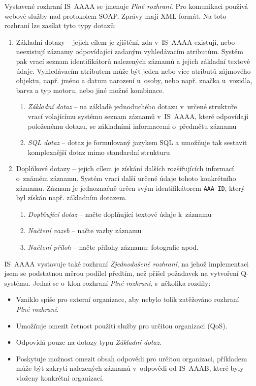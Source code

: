 \documentclass[thesis=M,czech]{FITthesis}[2019/12/23]
\begin{document}
\newpage
Vystavené rozhraní IS~AAAA se jmenuje \textit{Plné rozhraní}. Pro komunikaci používá webové služby nad protokolem SOAP. Zprávy mají XML formát.
Na toto rozhraní lze zasílat tyto typy dotazů: \cite{i1}
\begin{enumerate}
	\item Základní dotazy -- jejich cílem je zjištění, zda v~IS~AAAA existují, nebo neexistují záznamy odpovídající zadaným vyhledávacím atributům. Systém pak vrací seznam identifikátorů nalezených záznamů a jejich základní textové údaje. Vyhledávacím atributem může být jeden nebo více atributů zájmového objektu, např. jméno a datum narození u~osoby, nebo např. značka u~vozidla, barva a typ motoru, nebo jiné možné kombinace.
		\begin{enumerate}
			\item \textit{Základní dotaz} -- na základě jednoduchého dotazu v~určené struktuře vrací volajícímu systému seznam záznamů v~IS~AAAA, které odpovídají položenému dotazu, se základními informacemi o~předmětu záznamu
			\item \textit{SQL dotaz} -- dotaz je formulovaný jazykem SQL a umožňuje tak sestavit komplexnější dotaz mimo standardní strukturu
		\end{enumerate}
	\item Doplňkové dotazy -- jejich cílem je získání dalších rozšiřujících informací o~známém záznamu. Systém vrací další určené údaje tohoto konkrétního záznamu. Záznam je jednoznačně určen svým identifikátorem \texttt{AAA\_ID}, který byl získán např. základním dotazem.
		\begin{enumerate}
			\item \textit{Doplňující dotaz} -- načte doplňující textové údaje k~záznamu
			\item \textit{Načtení vazeb} -- načte vazby záznamu
			\item \textit{Načtení příloh} -- načte přílohy záznamu: fotografie apod.
		\end{enumerate}
\end{enumerate}

IS~AAAA vystavuje také rozhraní \textit{Zjednodušené rozhraní}, na jehož implementaci jsem se podstatnou měrou podílel předtím, než přišel požadavek na vytvoření Q-systému. Jedná se o~klon rozhraní \textit{Plné rozhraní}, s~několika rozdíly: \cite{i2}
	\begin{itemize}
		\item Vzniklo spíše pro externí organizace, aby nebylo tolik zatěžováno rozhraní \textit{Plné rozhraní}.
		\item Umožňuje omezit četnost použití služby pro určitou organizaci (QoS).
		\item Odpovídá pouze na dotazy typu \textit{Základní dotaz}.
		\item Poskytuje možnost omezit obsah odpovědi pro určitou organizaci, příkladem může být zakrytí nalezených záznamů v~odpovědi od IS~AAAB, které byly vloženy konkrétní organizací.
	\end{itemize}
	
\end{document}
